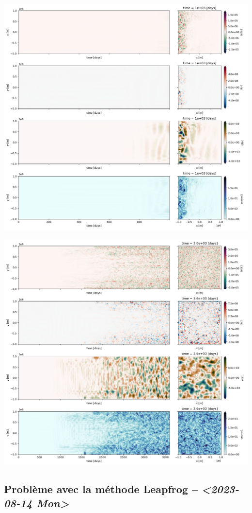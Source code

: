 \documentclass[10pt]{article}
\numberwithin{equation}{section}
\begin{document}
\begin{center}
\includegraphics[width=.9\linewidth]{figures/tests/2023-08-14_hovmoller1_t=1000days.png}
\end{center}
\begin{center}
\includegraphics[width=.9\linewidth]{figures/tests/2023-08-14_hovmoller1_t=3600days.png}
\end{center}


\subsection{Problème avec la méthode Leapfrog -- \textit{<2023-08-14 Mon>}}
\label{sec:org907262f}
\end{document}

